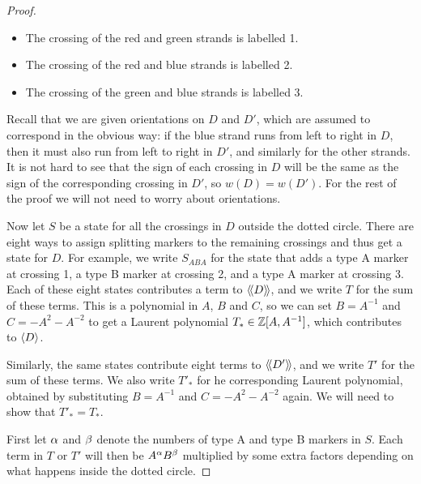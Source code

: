 \documentclass[reqno]{amsart}
\theoremstyle{definition}
\begin{document}
\begin{proof}
\begin{itemize}
  \item The crossing of the red and green strands is labelled 1.
  \item The crossing of the red and blue strands is labelled 2.
  \item The crossing of the green and blue strands is labelled 3.
 \end{itemize}
 Recall that we are given orientations on $D$ and $D'$, which are
 assumed to correspond in the obvious way: if the blue strand runs
 from left to right in $D$, then it must also run from left to right
 in $D'$, and similarly for the other strands.  It is not hard to see
 that the sign of each crossing in $D$ will be the same as the sign of
 the corresponding crossing in $D'$, so $w(D)=w(D')$.  For the rest of
 the proof we will not need to worry about orientations.  

 Now let $S$ be a state for all the crossings in $D$ outside the
 dotted circle.  There are eight ways to assign splitting markers to
 the remaining crossings and thus get a state for $D$.  For example,
 we write $S_{ABA}$ for the state that adds a type A marker at
 crossing 1, a type B marker at crossing 2, and a type A marker at
 crossing 3.  Each of these eight states contributes a term to
 $\langle\!\langle D\rangle\!\rangle$, and we write $T$ for the sum of these terms.  This is a
 polynomial in $A$, $B$ and $C$, so we can set $B=A^{-1}$ and
 $C=-A^2-A^{-2}$ to get a Laurent polynomial $T_*\in\mathbb{Z}[A,A^{-1}]$,
 which contributes to $\langle D\rangle$.

 Similarly, the same states contribute eight terms to $\langle\!\langle D'\rangle\!\rangle$, and
 we write $T'$ for the sum of these terms.  We also write $T'_*$ for
 he corresponding Laurent polynomial, obtained by substituting
 $B=A^{-1}$ and $C=-A^2-A^{-2}$ again.  We will need to show that
 $T'_*=T_*$.  

 First let $\alpha$ and $\beta$ denote the numbers of type A and type B
 markers in $S$.  Each term in $T$ or $T'$ will then be $A^\alpha B^\beta$
 multiplied by some extra factors depending on what happens inside the
 dotted circle.  


\end{proof}
\end{document}
